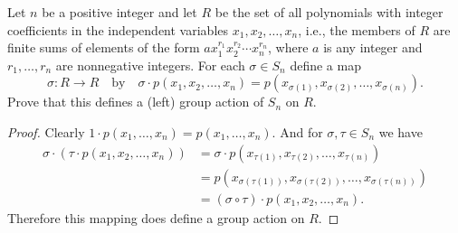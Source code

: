  Let $n$ be a positive integer and let $R$ be the set of
all polynomials with integer coefficients in the independent variables
$x_1,x_2,\dots,x_n$, i.e., the members of $R$ are finite sums of
elements of the form $ax_1^{r_1}x_2^{r_2}\cdots x_n^{r_n}$, where $a$
is any integer and $r_1,\dots,r_n$ are nonnegative integers. For each
$\sigma\in S_n$ define a map
\begin{equation*}
  \sigma\colon R\to R
  \quad\text{by}\quad
  \sigma\cdot p(x_1,x_2,\dots,x_n) = p(x_{\sigma(1)},x_{\sigma(2)},
  \dots,x_{\sigma(n)}).
\end{equation*}
Prove that this defines a (left) group action of $S_n$ on $R$.
\begin{proof}
  Clearly $1\cdot p(x_1,\dots,x_n) = p(x_1,\dots,x_n)$. And for
  $\sigma,\tau\in S_n$ we have
  \begin{align*}
    \sigma\cdot(\tau\cdot p(x_1,x_2,\dots,x_n))
    &= \sigma\cdot p(x_{\tau(1)},x_{\tau(2)},\dots,x_{\tau(n)}) \\
    &= p(x_{\sigma(\tau(1))},x_{\sigma(\tau(2))},\dots,x_{\sigma(\tau(n))}) \\
    &= (\sigma\circ\tau)\cdot p(x_1,x_2,\dots,x_n).
  \end{align*}
  Therefore this mapping does define a group action on $R$.
\end{proof}
